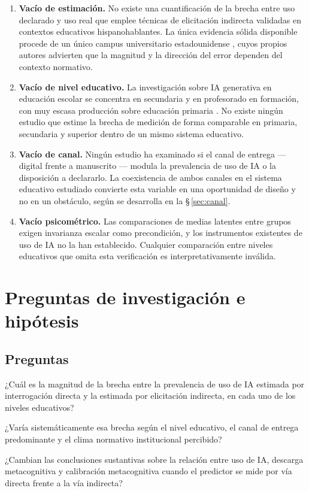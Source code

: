 \documentclass[11pt,a4paper]{article}
\begin{document}
\begin{enumerate}[leftmargin=1.4em,itemsep=0.45em]
	\item \textbf{Vacío de estimación.} No existe una cuantificación de la brecha entre uso declarado y uso real que emplee técnicas de elicitación indirecta validadas en contextos educativos hispanohablantes. La única evidencia sólida disponible procede de un único campus universitario estadounidense \citep{ling2026underreporting}, cuyos propios autores advierten que la magnitud y la dirección del error dependen del contexto normativo.
	\item \textbf{Vacío de nivel educativo.} La investigación sobre IA generativa en educación escolar se concentra en secundaria y en profesorado en formación, con muy escasa producción sobre educación primaria \citep{alfarwan2025generative}. No existe ningún estudio que estime la brecha de medición de forma comparable en primaria, secundaria y superior dentro de un mismo sistema educativo.
	\item \textbf{Vacío de canal.} Ningún estudio ha examinado si el canal de entrega --- digital frente a manuscrito --- modula la prevalencia de uso de IA o la disposición a declararlo. La coexistencia de ambos canales en el sistema educativo estudiado convierte esta variable en una oportunidad de diseño y no en un obstáculo, según se desarrolla en la §\,\ref{sec:canal}.
	\item \textbf{Vacío psicométrico.} Las comparaciones de medias latentes entre grupos exigen invarianza escalar como precondición, y los instrumentos existentes de uso de IA no la han establecido. Cualquier comparación entre niveles educativos que omita esta verificación es interpretativamente inválida.
\end{enumerate}

\section{Preguntas de investigación e hipótesis}

\subsection{Preguntas}

\begin{description}[leftmargin=3.3em,style=nextline,itemsep=0.4em]
	\item[\textbf{PI\,1}] ¿Cuál es la magnitud de la brecha entre la prevalencia de uso de IA estimada por interrogación directa y la estimada por elicitación indirecta, en cada uno de los niveles educativos?
	\item[\textbf{PI\,2}] ¿Varía sistemáticamente esa brecha según el nivel educativo, el canal de entrega predominante y el clima normativo institucional percibido?
	\item[\textbf{PI\,3}] ¿Cambian las conclusiones sustantivas sobre la relación entre uso de IA, descarga metacognitiva y calibración metacognitiva cuando el predictor se mide por vía directa frente a la vía indirecta?
\end{description}
\end{document}

